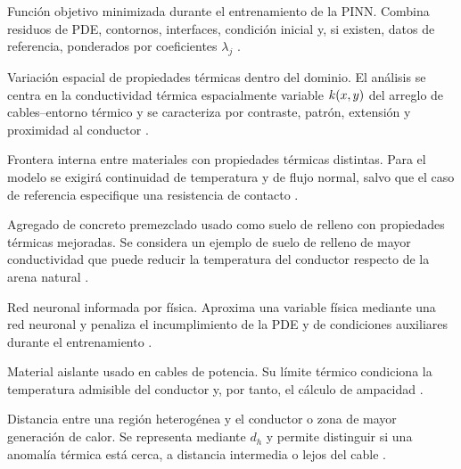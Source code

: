 \begin{description}[style=nextline,itemsep=0.5\baselineskip,parsep=0pt,topsep=0.25\baselineskip]
  \item[Función de pérdida.] Función objetivo minimizada durante el entrenamiento de la PINN. Combina residuos de PDE, contornos, interfaces, condición inicial y, si existen, datos de referencia, ponderados por coeficientes $\lambda_j$ \parencites[686--690]{raissi2019}[16]{pan2025}[1--2,17]{lawal2022}.

\item[Heterogeneidad térmica.] Variación espacial de propiedades térmicas dentro del dominio. El análisis se centra en la conductividad térmica espacialmente variable $k(x,y)$ del arreglo de cables--entorno térmico y se caracteriza por contraste, patrón, extensión y proximidad al conductor \parencites{farouki1981thermal,devries1966thermal}[4--6]{enescu2021}[1,6--9]{khumalo2025}[1,10,16]{kim2025}.

  \item[Interfaz térmica.] Frontera interna entre materiales con propiedades térmicas distintas. Para el modelo se exigirá continuidad de temperatura y de flujo normal, salvo que el caso de referencia especifique una resistencia de contacto \parencites{carslaw1959conduction,kakac2018heatConduction,hahn2012heatConduction}{patankar1980numerical}[3]{xing2023}[3--4,93--99]{cigre2025}.

  \item[Material PAC.] Agregado de concreto premezclado usado como suelo de relleno con propiedades térmicas mejoradas. Se considera un ejemplo de suelo de relleno de mayor conductividad que puede reducir la temperatura del conductor respecto de la arena natural \parencite[1,10,16]{kim2025}.

  \item[PINN.] Red neuronal informada por física. Aproxima una variable física mediante una red neuronal y penaliza el incumplimiento de la PDE y de condiciones auxiliares durante el entrenamiento \parencites[686--690]{raissi2019}[1--2,14--17]{lawal2022}[1,3,16]{pan2025}.

  \item[Polietileno reticulado o XLPE.] Material aislante usado en cables de potencia. Su límite térmico condiciona la temperatura admisible del conductor y, por tanto, el cálculo de ampacidad \parencites{iec60502_2_2014}[3--5]{enescu2020}[fig.~2]{kim2025}.

  \item[Proximidad de heterogeneidad.] Distancia entre una región heterogénea y el conductor o zona de mayor generación de calor. Se representa mediante $d_h$ y permite distinguir si una anomalía térmica está cerca, a distancia intermedia o lejos del cable \parencites[1,6--9]{khumalo2025}[1,10,16]{kim2025}[1--4]{oclon2015}.


\end{description}
